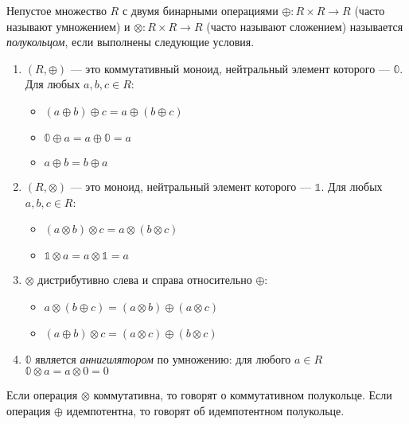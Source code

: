 \begin{definition}

Непустое множество $R$ с двумя бинарными операциями $\oplus\colon R \times R \to R$ (часто называют умножением) и $\otimes \colon R \times R \to R$ (часто называют сложением) называется \emph{полукольцом}, если выполнены следующие условия.
\begin{enumerate}

\item $(R, \oplus)$ --- это коммутативный моноид, нейтральный элемент которого --- $\mathbb{0}$. Для любых $a,b,c \in R$:
\begin{itemize}
	\item $(a \oplus b) \oplus c = a \oplus (b \oplus c)$
	\item $\mathbb{0} \oplus a = a \oplus \mathbb{0} = a$
	\item $a \oplus b = b \oplus a$
\end{itemize}

\item $(R, \otimes)$ --- это моноид, нейтральный элемент которого --- $\mathbb{1}$. Для любых $a,b,c \in R$:
\begin{itemize}
	\item $(a \otimes b) \otimes c = a \otimes (b \otimes c)$
    \item $\mathbb{1} \otimes a = a \otimes \mathbb{1} = a$
\end{itemize}

\item $\otimes$ дистрибутивно слева и справа относительно $\oplus$:
\begin{itemize}
	\item $a \otimes (b \oplus c) = (a \otimes b) \oplus (a \otimes c)$
    \item $(a \oplus b) \otimes c = (a \otimes c) \oplus (b \otimes c)$
\end{itemize}


\item $\mathbb{0}$ является \textit{аннигилятором} по умножению: для любого $a \in R$
$\mathbb{0} \otimes a = a \otimes 0 = 0$

\end{enumerate}

Если операция $\otimes$ коммутативна, то говорят о коммутативном полукольце.
Если операция $\oplus$ идемпотентна, то говорят об идемпотентном полукольце.

\end{definition}

